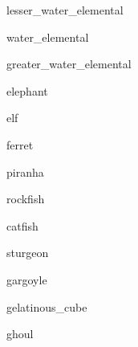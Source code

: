 \documentclass[letterpaper,serif]{module}
\begin{document}
\begin{newmonster}{lesser_water_elemental}\end{newmonster}

\begin{newmonster}{water_elemental}\end{newmonster}

\begin{newmonster}{greater_water_elemental}\end{newmonster}

\begin{newmonster}{elephant}\end{newmonster}

\begin{newmonster}{elf}\end{newmonster}

\begin{newmonster}{ferret}\end{newmonster}


\begin{newmonster}{piranha}\end{newmonster}

\begin{newmonster}{rockfish}\end{newmonster}

\begin{newmonster}{catfish}\end{newmonster}

\begin{newmonster}{sturgeon}\end{newmonster}

\begin{newmonster}{gargoyle}\end{newmonster}

\begin{newmonster}{gelatinous_cube}\end{newmonster}

\begin{newmonster}{ghoul}\end{newmonster}
\end{document}
